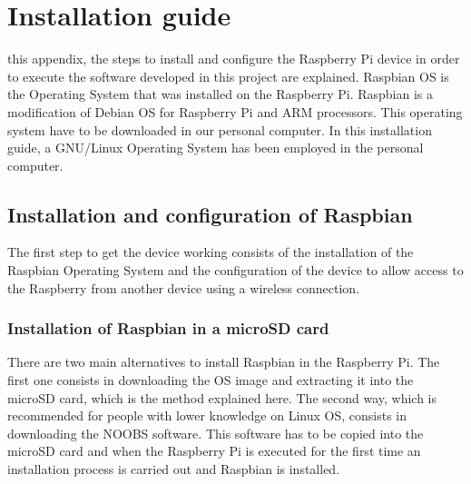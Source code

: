 
\chapter{Installation guide}
\label{chap:installation_guide}

 this appendix, the steps to install and configure the Raspberry Pi device in order to execute the software developed in this project are explained. Raspbian \ac{OS} \cite{Raspbian} is the Operating System that was installed on the Raspberry Pi. Raspbian is a modification of Debian \ac{OS} for Raspberry Pi and ARM processors. This operating system have to be downloaded in our personal computer. In this installation guide, a GNU/Linux Operating System has been employed in the personal computer.


\section{Installation and configuration of Raspbian}
The first step to get the device working consists of the installation of the Raspbian Operating System and the configuration of the device to allow access to the Raspberry from another device using a wireless connection.

\subsection{Installation of Raspbian in a microSD card}
There are two main alternatives to install Raspbian in the Raspberry Pi. The first one consists in downloading the \ac{OS} image and extracting it into the microSD card, which is the method explained here. The second way, which is recommended for people with lower knowledge on Linux \ac{OS}, consists in downloading the NOOBS software. This software has to be copied into the microSD card and when the Raspberry Pi is executed for the first time an installation process is carried out and Raspbian is installed. 

